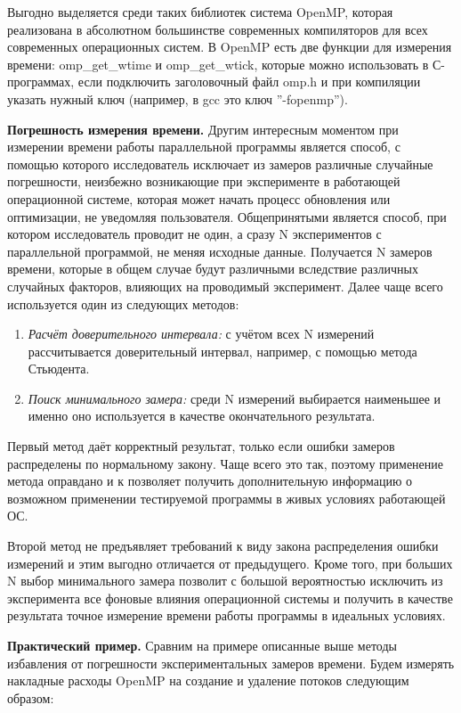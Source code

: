 Выгодно выделяется среди таких библиотек система OpenMP, которая реализована в абсолютном большинстве современных компиляторов для всех современных операционных систем. В OpenMP есть две функции для измерения времени: omp\_get\_wtime и omp\_get\_wtick, которые можно использовать в С-программах, если подключить заголовочный файл omp.h и при компиляции указать нужный ключ (например, в gcc это ключ ''-fopenmp'').

\textbf{Погрешность измерения времени.} Другим интересным моментом при измерении времени работы параллельной программы является способ, с помощью которого исследователь исключает из замеров различные случайные погрешности, неизбежно возникающие при эксперименте в работающей операционной системе, которая может начать процесс обновления или оптимизации, не уведомляя пользователя. Общепринятыми является способ, при котором исследователь проводит не один, а сразу N экспериментов с параллельной программой, не меняя исходные данные. Получается N замеров времени, которые в общем случае будут различными вследствие различных случайных факторов, влияющих на проводимый эксперимент. Далее чаще всего используется один из следующих методов:

\begin{enumerate}
    \item\textit{Расчёт доверительного интервала:} с учётом всех N измерений рассчитывается доверительный интервал, например, с помощью метода Стьюдента.
    \item\textit{Поиск минимального замера:} среди N измерений выбирается наименьшее и именно оно используется в качестве окончательного результата.
\end{enumerate}

Первый метод даёт корректный результат, только если ошибки замеров распределены по нормальному закону. Чаще всего это так, поэтому применение метода оправдано и к позволяет получить дополнительную информацию о возможном применении тестируемой программы в живых условиях работающей ОС.

Второй метод не предъявляет требований к виду закона распределения ошибки измерений и этим выгодно отличается от предыдущего. Кроме того, при больших N выбор минимального замера позволит с большой вероятностью исключить из эксперимента все фоновые влияния операционной системы и получить в качестве результата точное измерение времени работы программы в идеальных условиях. 

\textbf{Практический пример.} Сравним на примере описанные выше методы избавления от погрешности экспериментальных замеров времени. Будем измерять накладные расходы OpenMP на создание и удаление потоков следующим образом:


